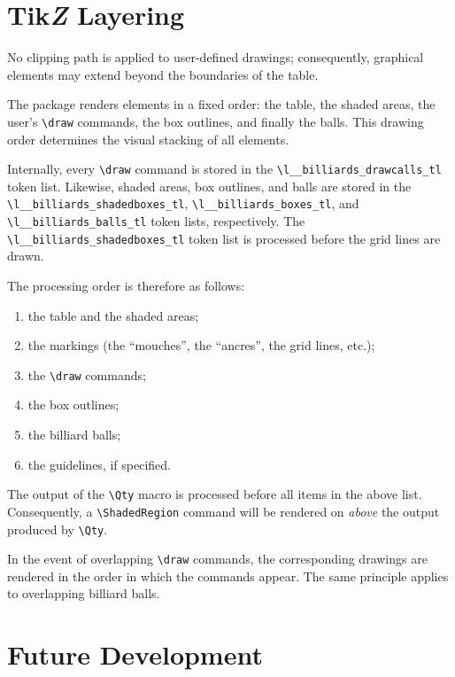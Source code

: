 \documentclass[11pt,a4paper]{ltxdoc}
\def\bluett#1{{\color{blue}\texttt{#1}}}
\begin{document}
\section{Tik\textit{Z} Layering}

No clipping path is applied to user-defined drawings; consequently, graphical elements may extend beyond the boundaries of the table.

The package renders elements in a fixed order: the table, the shaded areas, the user's \bluett{\textbackslash draw} commands, the box outlines, and finally the balls. This drawing order determines the visual stacking of all elements.

Internally, every \bluett{\textbackslash draw} command is stored in the \verb|\l__billiards_drawcalls_tl| token list. Likewise, shaded areas, box outlines, and balls are stored in the \verb|\l__billiards_shadedboxes_tl|, \verb|\l__billiards_boxes_tl|, and \verb|\l__billiards_balls_tl| token lists, respectively. The \verb|\l__billiards_shadedboxes_tl| token list is processed before the grid lines are drawn.

The processing order is therefore as follows:
\begin{enumerate}
    \item the table and the shaded areas;
    \item the markings (the ``mouches'', the ``ancres'', the grid lines, etc.);
    \item the \bluett{\textbackslash draw} commands;
    \item the box outlines;
    \item the billiard balls;
    \item the guidelines, if specified.
\end{enumerate}

The output of the \bluett{\textbackslash Qty} macro is processed before all items in the above list. Consequently, a \bluett{\textbackslash ShadedRegion} command will be rendered on \textit{above} the output produced by \bluett{\textbackslash Qty}.

In the event of overlapping \bluett{\textbackslash draw} commands, the corresponding drawings are rendered in the order in which the commands appear. The same principle applies to overlapping billiard balls.

\section{Future Development}
\end{document}
